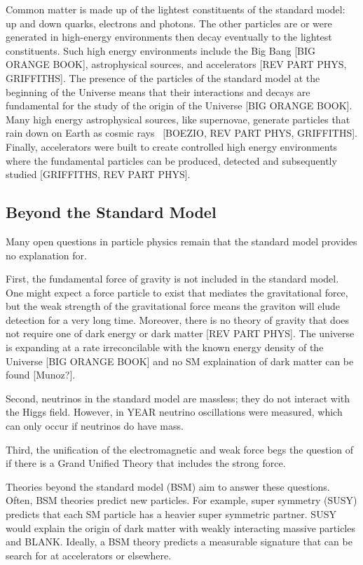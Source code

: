 Common matter is made up of the lightest constituents of the standard model: up and down quarks, electrons and photons. The other particles are or were generated in high-energy environments then decay eventually to the lightest constituents. Such high energy environments include the Big Bang [BIG ORANGE BOOK], astrophysical sources, and accelerators [REV PART PHYS, GRIFFITHS]. The presence of the particles of the standard model at the beginning of the Universe means that their interactions and decays are fundamental for the study of the origin of the Universe [BIG ORANGE BOOK]. Many high energy astrophysical sources, like supernovae, generate particles that rain down on Earth as cosmic rays~\cite{boezio_chemical_2012} [BOEZIO, REV PART PHYS, GRIFFITHS]. Finally, accelerators were built to create controlled high energy environments where the fundamental particles can be produced, detected and subsequently studied [GRIFFITHS, REV PART PHYS].

\subsection{Beyond the Standard Model}

Many open questions in particle physics remain that the standard model provides no explanation for.

First, the fundamental force of gravity is not included in the standard model. One might expect a force particle to exist that mediates the gravitational force, but the weak strength of the gravitational force means the graviton will elude detection for a very long time. Moreover, there is no theory of gravity that does not require one of dark energy or dark matter [REV PART PHYS]. The universe is expanding at a rate irreconcilable with the known energy density of the Universe [BIG ORANGE BOOK] and no SM explaination of dark matter can be found [Munoz?]. 

Second, neutrinos in the standard model are massless; they do not interact with the Higgs field. However, in YEAR neutrino oscillations were measured, which can only occur if neutrinos do have mass. 

Third, the unification of the electromagnetic and weak force begs the question of if there is a Grand Unified Theory that includes the strong force. 

Theories beyond the standard model (BSM) aim to answer these questions. Often, BSM theories predict new particles. For example, super symmetry (SUSY) predicts that each SM particle has a heavier super symmetric partner. SUSY would explain the origin of dark matter with weakly interacting massive particles and BLANK. Ideally, a BSM theory predicts a measurable signature that can be search for at accelerators or elsewhere.

